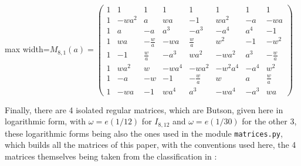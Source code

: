 \documentclass[11pt]{amsart}
\begin{document}
\begin{center}\normalsize\setlength{\arraycolsep}{3.8pt}
\begin{adjustbox}{max width=\textwidth}$\displaystyle M_{8,1}(a)=\begin{pmatrix}
1 & 1 & 1 & 1 & 1 & 1 & 1 & 1 \\
1 & -wa^{2} & a & wa & -1 & wa^{2} & -a & -wa \\
1 & a & -a & a^{3} & -a^{3} & -a^{4} & a^{4} & -1 \\
1 & wa & -\frac{w}{a} & -wa & \frac{w}{a} & w^2 & -1 & -w^2 \\
1 & -1 & \frac{w}{a} & -a^{3} & wa^{2} & -wa^{2} & a^{3} & -\frac{w}{a} \\
1 & wa^{2} & w & -wa^{4} & -wa^{2} & -w^2a^{4} & -a^{4} & w^2 \\
1 & -a & -w & -1 & -\frac{w}{a} & w & a & \frac{w}{a} \\
1 & -wa & -1 & wa^{4} & a^{3} & -wa^{4} & -a^{3} & wa
\end{pmatrix}$\end{adjustbox}
\end{center}

\noindent Finally, there are 4 isolated regular matrices, which are Butson, given here in logarithmic form, with $\omega=e(1/12)$ for $I_{8,12}$ and $\omega=e(1/30)$ for the other 3, these logarithmic forms being also the ones used in the module \texttt{matrices.py}, which builds all the matrices of this paper, with the conventions used here, the 4 matrices themselves being taken from the classification in \cite{gt}:
\end{document}
